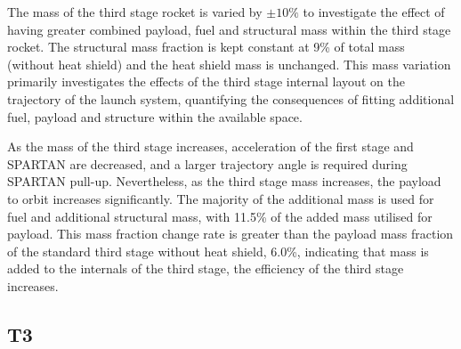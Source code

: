 The mass of the third stage rocket is varied by $\pm10\%$ to investigate the effect of having greater combined  payload, fuel and structural mass within the third stage rocket. The structural mass fraction is kept constant at 9\% of total mass (without heat shield) and the heat shield mass is unchanged. This mass variation primarily investigates the effects of the third stage internal layout on the trajectory of the launch system, quantifying the consequences of fitting additional fuel, payload and structure within the available space.
  
 As the mass of the third stage increases, acceleration of the first stage and SPARTAN are decreased, and a larger trajectory angle is required during SPARTAN pull-up. Nevertheless, as the third stage mass increases, the payload to orbit increases significantly.
The majority of the additional mass is used for fuel and additional structural mass, with 11.5\% of the added mass utilised for payload. This mass fraction change rate is greater than the payload mass fraction of the standard third stage without heat shield, 6.0\%, indicating that mass is added to the internals of the third stage, the efficiency of the third stage increases.


\subsection{T3}

